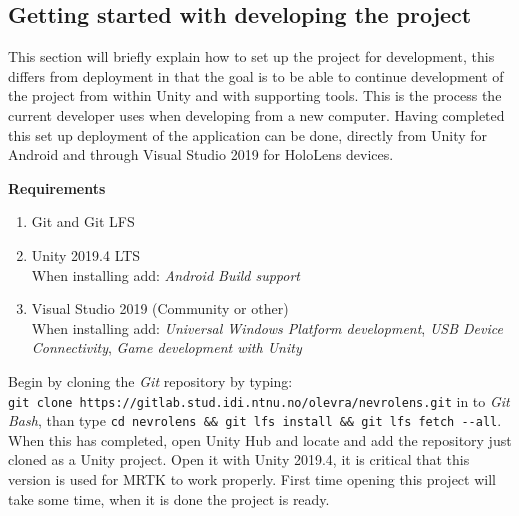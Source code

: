 \subsection*{Getting started with developing the project}
This section will briefly explain how to set up the project for development, this differs from deployment in that the goal is to be able to continue development of the project from within Unity and with supporting tools. This is the process the current developer uses when developing from a new computer.
Having completed this set up deployment of the application can be done, directly from Unity for Android and through Visual Studio 2019 for HoloLens devices.


\textbf{Requirements}
\begin{enumerate}
    \item Git and Git LFS
    \item { Unity 2019.4 LTS \\
    When installing add: \textit{Android Build support} }
    \item {Visual Studio 2019 (Community or other)\\
    When installing add: \textit{Universal Windows Platform development}, \textit{USB Device Connectivity}, \textit{Game development with Unity} }
\end{enumerate}
Begin by cloning the \textit{Git} repository by typing: \\ \texttt{git clone https://gitlab.stud.idi.ntnu.no/olevra/nevrolens.git} in to \textit{Git Bash}, than type \texttt{cd nevrolens \&\& git lfs install \&\& git lfs fetch -{}-all}. When this has completed, open Unity Hub and locate and add the repository just cloned as a Unity project. Open it with Unity 2019.4, it is critical that this version is used for MRTK to work properly. First time opening this project will take some time, when it is done the project is ready.
